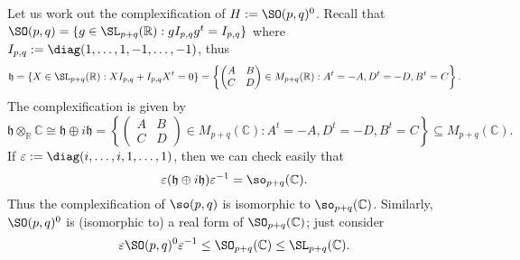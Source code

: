 \documentclass[reqno]{amsart} 
\def\eps{\varepsilon}
\begin{document}
Let us work out the complexification of $H := \SO(p,q)^0$.
Recall that
$\SO(p,q) = \{g \in \SL_{p+q}(\mathbb{R}) : g I_{p,q} g^t =
I_{p,q}\}$
where
$I_{p,q} := \diag(1,\dotsc,1,-1,\dotsc,-1)$,
thus
\begin{equation*}
  \mathfrak{h} = \{X \in \SL_{p+q}(\mathbb{R}) :
  X I_{p,q} + I_{p,q} X^t = 0 \}
  = \left\{ 
\begin{pmatrix}
      A & B \\
      C & D
    \end{pmatrix}
 \in M_{p+q}(\mathbb{R})
    : A^t = - A, D^t = - D, B^t = C \right\}.
\end{equation*}
The complexification is given by
\begin{equation*}
  \mathfrak{h} \otimes_{\mathbb{R}} \mathbb{C}
  \cong 
  \mathfrak{h}  \oplus i \mathfrak{h}
  =
   \left\{ 
\begin{pmatrix}
      A & B \\
      C & D
    \end{pmatrix}
 \in M_{p+q}(\mathbb{C}) : A^t = - A, D^t = -
    D, B^t= C 
  \right\} \subseteq M_{p+q}(\mathbb{C}).
\end{equation*}
If $\eps := \diag(i,\dotsc,i,1,\dotsc,1)$,
then we can check easily that
\begin{equation*}
  \eps (\mathfrak{h} \oplus i \mathfrak{h}) \eps^{-1}
  =
  \so_{p+q}(\mathbb{C}).
\end{equation*}
Thus the complexification of $\so(p,q)$
is isomorphic to $\so_{p+q}(\mathbb{C})$.
Similarly,
$\SO(p,q)^0$ is (isomorphic to)
a real form of $\SO_{p+q}(\mathbb{C})$;
just consider
\begin{equation*}
  \eps \SO(p,q)^0 \eps^{-1}
  \leq \SO_{p+q}(\mathbb{C}) \leq \SL_{p+q}(\mathbb{C}).
\end{equation*}
\end{document}
